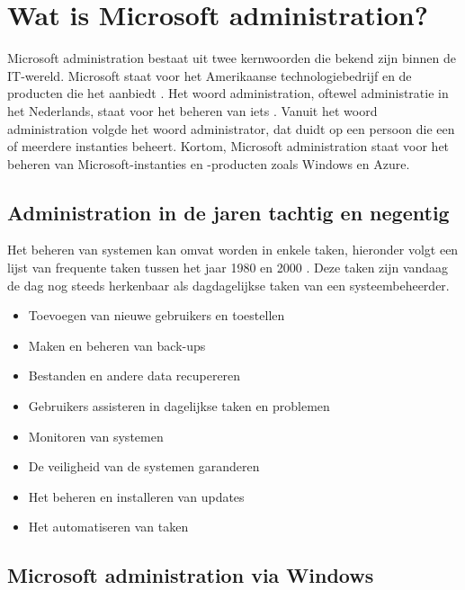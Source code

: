 \section{Wat is Microsoft administration?}


Microsoft administration bestaat uit twee kernwoorden die bekend zijn binnen de \ac{IT}-wereld. Microsoft staat voor het Amerikaanse technologiebedrijf en de producten die het aanbiedt \autocite{Warner2019}. Het woord administration, oftewel administratie in het Nederlands, staat voor het beheren van iets \autocite{Burgess2003}. Vanuit het woord administration volgde het woord administrator, dat duidt op een persoon die een of meerdere instanties beheert. Kortom, Microsoft administration staat voor het beheren van Microsoft-instanties en -producten zoals Windows en Azure. 

\subsection{Administration in de jaren tachtig en negentig}


Het beheren van systemen kan omvat worden in enkele taken, hieronder volgt een lijst van frequente taken tussen het jaar 1980 en 2000 \autocite{Frisch2002}. Deze taken zijn vandaag de dag nog steeds herkenbaar als dagdagelijkse taken van een systeembeheerder.

\begin{itemize}
    \item Toevoegen van nieuwe gebruikers en toestellen
    \item Maken en beheren van back-ups
    \item Bestanden en andere data recupereren
    \item Gebruikers assisteren in dagelijkse taken en problemen
    \item Monitoren van systemen
    \item De veiligheid van de systemen garanderen
    \item Het beheren en installeren van updates
    \item Het automatiseren van taken
\end{itemize} 

\subsection{Microsoft administration via Windows}

